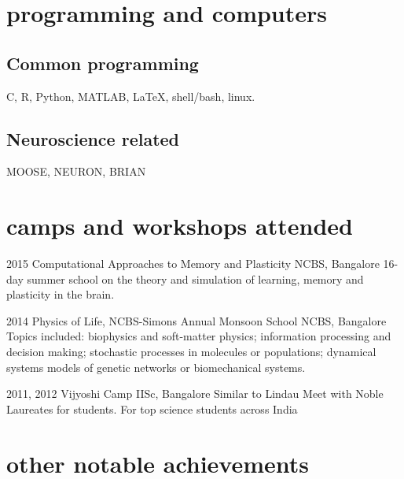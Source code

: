 \documentclass[11pt]{friggeri-cv}%
\begin{document}
\section{programming and computers}
\subsection{Common programming}
C,
 R, 
 Python,
    MATLAB,
{    \lotsoftextfont \LaTeX},
    shell/bash,
    linux.
\subsection{Neuroscience related}
MOOSE, NEURON, BRIAN 

\pagebreak

\section{camps and workshops attended}

\begin{entrylist}
  \entryy
    {2015}
    {Computational Approaches to Memory and Plasticity }
    {NCBS, Bangalore}
    {16-day summer school on the theory and simulation of learning, memory and plasticity in the brain.}    
\end{entrylist}
\begin{entrylist}
  \entryy
    {2014}
    {Physics of Life, NCBS-Simons Annual Monsoon School}
    {NCBS, Bangalore}
    {Topics included: biophysics and soft-matter physics; information processing and decision making; stochastic processes in molecules or populations; dynamical systems models of genetic networks or biomechanical systems.}    
\end{entrylist}
\begin{entrylist}
  \entryy
    {2011, 2012}
    {Vijyoshi Camp}
    {IISc, Bangalore}
    {Similar to Lindau Meet with Noble Laureates for students. For top  science students across India }
\end{entrylist}

\section{other notable achievements}
\end{document}
